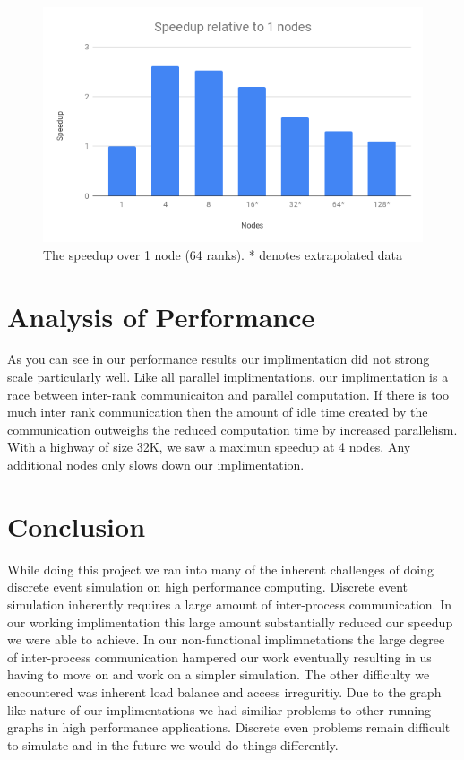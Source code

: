 \documentclass[10pt,a4paper]{article}
\begin{document}
\begin{figure}[H]
    \centering
    \includegraphics[scale=0.3]{speedup.png}
    \caption{The speedup over 1 node (64 ranks). * denotes extrapolated data}
    \label{fig:my_label}
\end{figure}


\section{Analysis of Performance}

As you can see in our performance results our implimentation did not strong scale
particularly well. Like all parallel implimentations, our implimentation is a race between inter-rank communicaiton and parallel computation. If there is too much inter rank communication then the amount of idle time created by the communication outweighs the reduced computation time by increased parallelism. With a highway of size 32K, we saw a maximun speedup at 4 nodes. Any additional nodes only slows down our implimentation.

\section{Conclusion}
While doing this project we ran into many of the inherent challenges of doing discrete event simulation on high performance computing. Discrete event simulation inherently requires a large amount of inter-process communication. In our working implimentation this large amount substantially reduced our speedup we were able to achieve. In our non-functional implimnetations the large degree of inter-process communication hampered our work eventually resulting in us having to move on and work on a simpler simulation. The other difficulty we encountered was inherent load balance and access irreguritiy. Due to the graph like nature of our implimentations we had similiar problems to other running graphs in high performance applications. Discrete even problems remain difficult to simulate and in the future we would do things differently.
\end{document}
